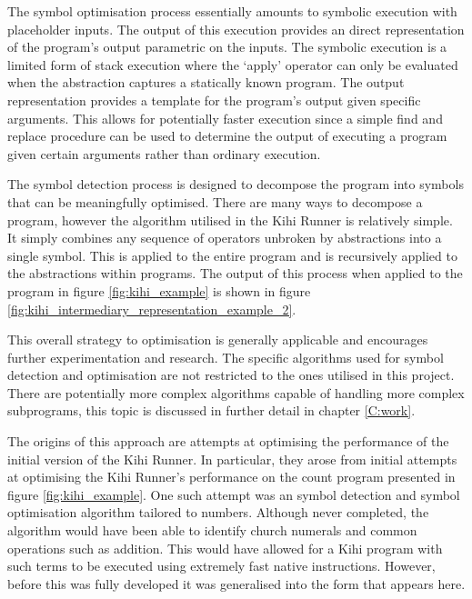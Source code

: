 The symbol optimisation process essentially amounts to symbolic execution with placeholder inputs. The output of this execution provides an direct representation of the program's output parametric on the inputs. The symbolic execution is a limited form of stack execution where the `apply' operator can only be evaluated when the abstraction captures a statically known program. The output representation provides a template for the program's output given specific arguments. This allows for potentially faster execution since a simple find and replace procedure can be used to determine the output of executing a program given certain arguments rather than ordinary execution. 



The symbol detection process is designed to decompose the program into symbols that can be meaningfully optimised. There are many ways to decompose a program, however the algorithm utilised in the Kihi Runner is relatively simple. It simply combines any sequence of operators unbroken by abstractions into a single symbol. This is applied to the entire program and is recursively applied to the abstractions within programs. The output of this process when applied to the program in figure \ref{fig:kihi_example} is shown in figure \ref{fig:kihi_intermediary_representation_example_2}.

This overall strategy to optimisation is generally applicable and encourages further experimentation and research. The specific algorithms used for symbol detection and optimisation are not restricted to the ones utilised in this project. There are potentially more complex algorithms capable of handling more complex subprograms, this topic is discussed in further detail in chapter \ref{C:work}.

The origins of this approach are attempts at optimising the performance of the initial version of the Kihi Runner. In particular, they arose from initial attempts at optimising the Kihi Runner's performance on the count program presented in figure \ref{fig:kihi_example}. One such attempt was an symbol detection and symbol optimisation algorithm tailored to numbers. Although never completed, the algorithm would have been able to identify church numerals and common operations such as addition. This would have allowed for a Kihi program with such terms to be executed using extremely fast native instructions. However, before this was fully developed it was generalised into the form that appears here.


